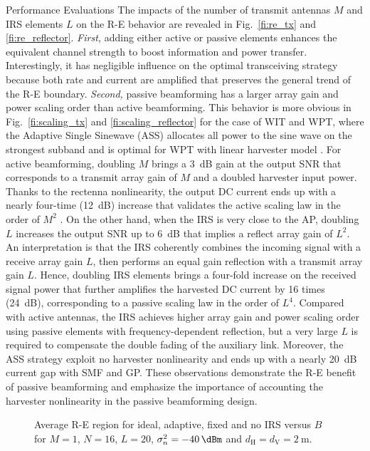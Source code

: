 \documentclass[journal]{IEEEtran}
\begin{document}
\begin{section}{Performance Evaluations}
		The impacts of the number of transmit antennas $M$ and IRS elements $L$ on the R-E behavior are revealed in Fig.~\ref{fi:re_tx} and \ref{fi:re_reflector}. \textit{First,} adding either active or passive elements enhances the equivalent channel strength to boost information and power transfer. Interestingly, it has negligible influence on the optimal transceiving strategy because both rate and current are amplified that preserves the general trend of the R-E boundary. \textit{Second,} passive beamforming has a larger array gain and power scaling order than active beamforming. This behavior is more obvious in Fig.~\ref{fi:scaling_tx} and \ref{fi:scaling_reflector} for the case of WIT and WPT, where the Adaptive Single Sinewave (ASS) allocates all power to the sine wave on the strongest subband and is optimal for WPT with linear harvester model \cite{Clerckx2016a}. For active beamforming, doubling $M$ brings a \SI{3}{\dB} gain at the output SNR that corresponds to a transmit array gain of $M$ and a doubled harvester input power. Thanks to the rectenna nonlinearity, the output DC current ends up with a nearly four-time (\SI{12}{\dB}) increase that validates the active scaling law in the order of $M^2$ \cite{Clerckx2016a}. On the other hand, when the IRS is very close to the AP, doubling $L$ increases the output SNR up to \SI{6}{\dB} that implies a reflect array gain of $L^2$. An interpretation is that the IRS coherently combines the incoming signal with a receive array gain $L$, then performs an equal gain reflection with a transmit array gain $L$. Hence, doubling IRS elements brings a four-fold increase on the received signal power that further amplifies the harvested DC current by \num{16} times (\SI{24}{\dB}), corresponding to a passive scaling law in the order of $L^4$. Compared with active antennas, the IRS achieves higher array gain and power scaling order using passive elements with frequency-dependent reflection, but a very large $L$ is required to compensate the double fading of the auxiliary link. Moreover, the ASS strategy exploit no harvester nonlinearity and ends up with a nearly \SI{20}{\dB} current gap with SMF and GP. These observations demonstrate the R-E benefit of passive beamforming and emphasize the importance of accounting the harvester nonlinearity in the passive beamforming design.

		\begin{figure}[!t]
			\centering
			\subfloat[$B=\SI{1}{\MHz}$\label{fi:re_irs_1mhz}]{
				\resizebox{0.45\columnwidth}{!}{
					
				}
			}
			\subfloat[$B=\SI{10}{\MHz}$\label{fi:re_irs_10mhz}]{
				\resizebox{0.45\columnwidth}{!}{
					
				}
			}
			\caption{Average R-E region for ideal, adaptive, fixed and no IRS versus $B$ for $M=1$, $N=16$, $L=20$, $\sigma_n^2=\SI{-40}{\dBm}$ and $d_{\mathrm{H}}=d_{\mathrm{V}}=\SI{2}{\meter}$.}
		\end{figure}


\end{section}
\end{document}
